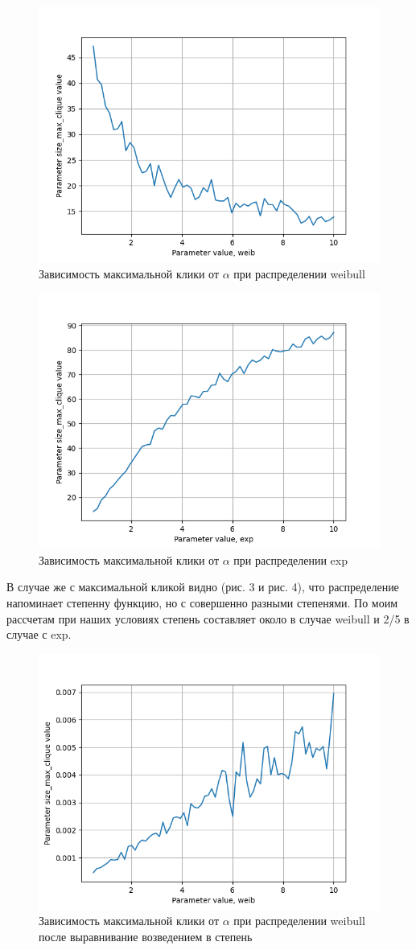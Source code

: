 \documentclass{HSEtitle}
\begin{document}
\begin{figure}[h]
    \centering
    \includegraphics[width=0.65\linewidth]{weib_alpha.png}
    \caption{Зависимость максимальной клики от $\alpha$ при распределении weibull}
    \label{fig:enter-label}
\end{figure}

\pagebreak

\begin{figure}[ht]
    \centering
    \includegraphics[width=0.65\linewidth]{exp_alpha.png}
    \caption{Зависимость максимальной клики от $\alpha$ при распределении exp}
    \label{fig:enter-label}
\end{figure}

В случае же с максимальной кликой видно (рис. 3 и рис. 4), что распределение напоминает степенну функцию, но с совершенно разными степенями. По моим рассчетам при наших условиях степень составляет около  в случае weibull и 2/5 в случае с exp.

\begin{figure}[hb]
    \centering
    \includegraphics[width=0.65\linewidth]{weib_alpha_fix.png}
    \caption{Зависимость максимальной клики от $\alpha$ при распределении weibull после выравнивание возведением в степень}
    \label{fig:enter-label}
\end{figure}
\end{document}

